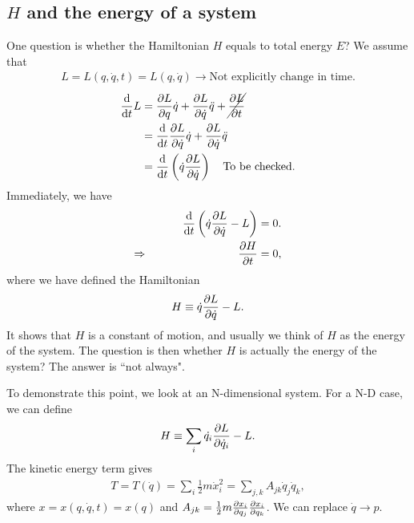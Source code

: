 \subsection{$ H $ and the energy of a system}
One question is whether the Hamiltonian $ H $ equals to total energy $ E $? We assume that
\begin{align}
L=L(q,\dot{q},t)=L(q,\dot{q})\rightarrow \textrm{Not explicitly change in time.}
\end{align}
\begin{align}
\frac{{\mathrm d} {}}{{\mathrm d}t} L &= \frac{\partial {L}}{\partial {q}}\dot{q}+\frac{\partial {L}}{\partial {\dot{q}}}\ddot{q}+\cancel{\frac{\partial {L}}{\partial t}}\\
&= \frac{{\mathrm d} {}}{{\mathrm d}t} \frac{\partial {L}}{\partial {\dot{q}}} \dot
{q}+ \frac{\partial {L}}{\partial {\dot{q}}}\ddot{q}\\
&= \frac{{\mathrm d} {}}{{\mathrm d}t} \left(\dot{q}\frac{\partial {L}}{\partial {\dot{q}}} \right)\quad \textrm{To be checked.}
\end{align}
Immediately, we have
\begin{align}
 \frac{{\mathrm d} {}}{{\mathrm d}t} \left(\dot{q}\frac{\partial {L}}{\partial {\dot{q}}}-L \right)&=0.\\
\Rightarrow \qquad \qquad \qquad \qquad  \frac{\partial {H}}{\partial {t}} &= 0,
\end{align}
where we have defined the Hamiltonian 
\begin{align}
H\equiv \dot{q}\frac{\partial {L}}{\partial {\dot{q}}}-L.
\end{align}
It shows that $ H $ is a constant of motion, and usually we think of $ H $ as the energy of the system. The question is then whether $ H $ is actually the energy of the system? The answer is ``not always".

To demonstrate this point, we look at an N-dimensional system. For a N-D case, we can define
\begin{align}
H\equiv \sum_i \dot{q_i}\frac{\partial {L}}{\partial {\dot{q}_i}}-L. 
\end{align}
The kinetic energy term gives
\begin{align}
T=T(\dot{q})=\sum_i \frac{1}{2}m \dot{x}_i^2= \sum_{j,k} A_{jk}\dot{q}_j \dot{q}_k,
\end{align}
where $ x=x(q,\dot{q},t)=x(q) $ and $ A_{jk}= \frac{1}{2}m \frac{\partial {x_i}}{\partial {q_j}}\frac{\partial {x_i}}{\partial {q_k}} $. We can replace $ \dot{q}\rightarrow p $. 

